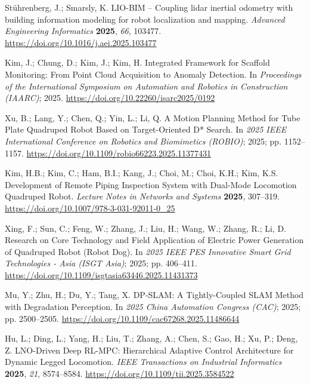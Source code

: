Stührenberg, J.; Smarsly, K. LIO-BIM – Coupling lidar inertial odometry with building information modeling for robot localization and mapping. \emph{Advanced Engineering Informatics} \textbf{2025}, \emph{66}, 103477. \url{https://doi.org/10.1016/j.aei.2025.103477}

Kim, J.; Chung, D.; Kim, J.; Kim, H. Integrated Framework for Scaffold Monitoring: From Point Cloud Acquisition to Anomaly Detection. In \emph{Proceedings of the International Symposium on Automation and Robotics in Construction (IAARC)}; 2025. \url{https://doi.org/10.22260/isarc2025/0192}

Xu, B.; Lang, Y.; Chen, Q.; Yin, L.; Li, Q. A Motion Planning Method for Tube Plate Quadruped Robot Based on Target-Oriented D* Search. In \emph{2025 IEEE International Conference on Robotics and Biomimetics (ROBIO)}; 2025; pp. 1152--1157. \url{https://doi.org/10.1109/robio66223.2025.11377431}

Kim, H.B.; Kim, C.; Ham, B.I.; Kang, J.; Choi, M.; Choi, K.H.; Kim, K.S. Development of Remote Piping Inspection System with Dual-Mode Locomotion Quadruped Robot. \emph{Lecture Notes in Networks and Systems} \textbf{2025}, 307--319. \url{https://doi.org/10.1007/978-3-031-92011-0_25}

Xing, F.; Sun, C.; Feng, W.; Zhang, J.; Liu, H.; Wang, W.; Zhang, R.; Li, D. Research on Core Technology and Field Application of Electric Power Generation of Quadruped Robot (Robot Dog). In \emph{2025 IEEE PES Innovative Smart Grid Technologies - Asia (ISGT Asia)}; 2025; pp. 406--411. \url{https://doi.org/10.1109/isgtasia63446.2025.11431373}

Mu, Y.; Zhu, H.; Du, Y.; Tang, X. DP-SLAM: A Tightly-Coupled SLAM Method with Degradation Perception. In \emph{2025 China Automation Congress (CAC)}; 2025; pp. 2500--2505. \url{https://doi.org/10.1109/cac67268.2025.11486644}

Hu, L.; Ding, L.; Yang, H.; Liu, T.; Zhang, A.; Chen, S.; Gao, H.; Xu, P.; Deng, Z. LNO-Driven Deep RL-MPC: Hierarchical Adaptive Control Architecture for Dynamic Legged Locomotion. \emph{IEEE Transactions on Industrial Informatics} \textbf{2025}, \emph{21}, 8574--8584. \url{https://doi.org/10.1109/tii.2025.3584522}

